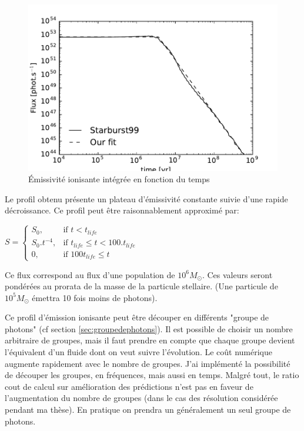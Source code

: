 \begin{figure}[htbp]
        \includegraphics[width=.95\linewidth]{img/03/flux.pdf} 
        \caption{Émissivité ionisante intégrée en fonction du temps}
 		\label{fig:flux}
\end{figure}

Le profil obtenu présente un plateau d'émissivité constante suivie d'une rapide décroissance.
Ce profil peut être raisonnablement approximé par:

$
    S = 
\begin{cases}
    S_0 ,         & \text{if } t < t_{life}\\
    S_0.t^{-4},   & \text{if } t_{life} \leq t < 100.t_{life} \\
    0,   & \text{if } 100t_{life} \leq t
\end{cases}
$

Ce flux correspond au flux d'une population de $10^6M_\odot$.
Ces valeurs seront pondérées au prorata de la masse de la particule stellaire. (Une particule de $10^5M_\odot$ émettra 10 fois moins de photons).


Ce profil d’émission ionisante peut être découper en différents "groupe de photons" (cf section \ref{sec:groupedephotons}).
Il est possible de choisir un nombre arbitraire de groupes, mais il faut prendre en compte que chaque groupe devient l'équivalent d'un fluide dont on veut suivre l'évolution.
Le coût numérique augmente rapidement avec le nombre de groupes. 
J'ai implémenté la possibilité de découper les groupes, en fréquences, mais aussi en temps.
Malgré tout, le ratio cout de calcul sur amélioration des prédictions n'est pas en faveur de l'augmentation du nombre de groupes (dans le cas des résolution considérée pendant ma thèse).
En pratique on prendra un généralement un seul groupe de photons.

